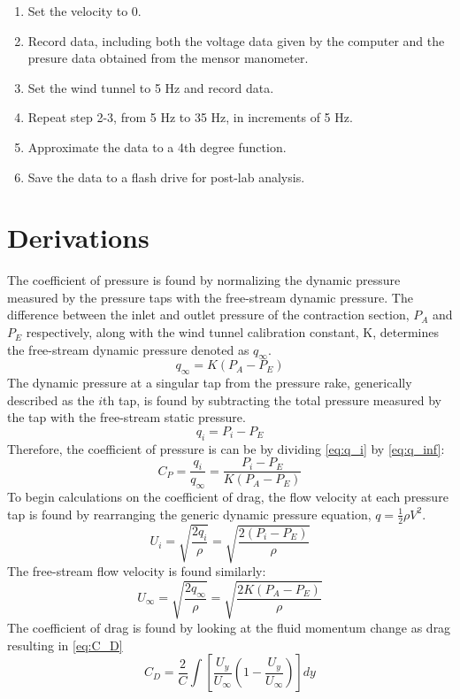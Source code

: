 \begin{enumerate}
\item Set the velocity to 0. \item Record data, including both the voltage data given by the computer and the presure data obtained from the mensor manometer.
\item Set the wind tunnel to 5 Hz and record data. 
\item Repeat step 2-3, from 5 Hz to 35 Hz, in increments of 5 Hz. 
\item Approximate the data to a 4th degree function. 
\item Save the data to a flash drive for post-lab analysis.
\end{enumerate}

\newpage
\section{Derivations}
The coefficient of pressure is found by normalizing the dynamic pressure measured by the pressure taps with the free-stream dynamic pressure. The difference between the inlet and outlet pressure of the contraction section, $P_A$ and $P_E$ respectively, along with the wind tunnel calibration constant, K, determines the free-stream dynamic pressure denoted as $q_\infty$.
\begin{equation}\label{eq:q_inf}
    q_\infty = K (P_A - P_E)
\end{equation}
The dynamic pressure at a singular tap from the pressure rake, generically described as the $i$th tap, is found by subtracting the total pressure measured by the tap with the free-stream static pressure.
\begin{equation}\label{eq:q_i}
    q_i = P_i - P_E 
\end{equation}
Therefore, the coefficient of pressure is can be by dividing \autoref{eq:q_i} by \autoref{eq:q_inf}:
\begin{equation}\label{eq:C_P}
    C_P = \frac{q_i}{q_\infty} = \frac{P_i - P_E }{K (P_A - P_E)}
\end{equation}
To begin calculations on the coefficient of drag, the flow velocity at each pressure tap is found by rearranging the generic dynamic pressure equation, $q = \frac{1}{2}\rho V^2$.
\begin{equation}\label{eq:U_i}
    U_i = \sqrt{\frac{2 q_i}{\rho}} = \sqrt{\frac{2 (P_i - P_E)}{\rho}}
\end{equation}
The free-stream flow velocity is found similarly: 
\begin{equation}\label{eq:U_inf}
    U_\infty = \sqrt{\frac{2 q_\infty}{\rho}} = \sqrt{\frac{2 K (P_A - P_E)}{\rho}}
\end{equation}
The coefficient of drag is found by looking at the fluid momentum change as drag resulting in \autoref{eq:C_D}
\begin{equation}\label{eq:C_D}
    C_D = \frac{2}{C} \int [\frac{U_y}{U_\infty}(1-\frac{U_y}{U_\infty})]dy
\end{equation}